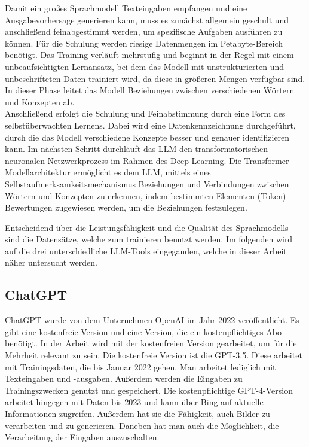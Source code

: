 Damit ein großes Sprachmodell Texteingaben empfangen und eine Ausgabevorhersage generieren kann, muss es zunächst 
allgemein geschult und anschließend feinabgestimmt werden, um spezifische Aufgaben ausführen zu können. Für die 
Schulung werden riesige Datenmengen im Petabyte-Bereich benötigt. Das Training verläuft mehrstufig und beginnt in 
der Regel mit einem unbeaufsichtigten Lernansatz, bei dem das Modell mit unstrukturierten und unbeschrifteten Daten 
trainiert wird, da diese in größeren Mengen verfügbar sind. In dieser Phase leitet das Modell Beziehungen zwischen 
verschiedenen Wörtern und Konzepten ab.\\
Anschließend erfolgt die Schulung und Feinabstimmung durch eine Form des selbstüberwachten Lernens. Dabei wird eine 
Datenkennzeichnung durchgeführt, durch die das Modell verschiedene Konzepte besser und genauer identifizieren kann. 
Im nächsten Schritt durchläuft das LLM den transformatorischen neuronalen Netzwerkprozess im Rahmen des Deep Learning. 
Die Transformer-Modellarchitektur ermöglicht es dem LLM, mittels eines Selbstaufmerksamkeitsmechanismus Beziehungen 
und Verbindungen zwischen Wörtern und Konzepten zu erkennen, indem bestimmten Elementen (Token) Bewertungen zugewiesen 
werden, um die Beziehungen festzulegen.

Entscheidend über die Leistungsfähigkeit und die Qualität des Sprachmodells sind die Datensätze, welche zum trainieren
benutzt werden. Im folgenden wird auf die drei unterschiedliche LLM-Tools eingeganden, welche in dieser Arbeit näher 
untersucht werden.

\subsection{ChatGPT}  \label{ChatGPT}

ChatGPT wurde von dem Unternehmen OpenAI im Jahr 2022 veröffentlicht. Es gibt eine kostenfreie Version und  
eine Version, die ein kostenpflichtiges Abo benötigt. In der Arbeit wird mit der kostenfreien Version gearbeitet,  
um für die Mehrheit relevant zu sein. Die kostenfreie Version ist die GPT-3.5. Diese arbeitet mit Trainingsdaten,  
die bis Januar 2022 gehen. Man arbeitet lediglich mit Texteingaben und -ausgaben. Außerdem werden die Eingaben  
zu Trainingszwecken genutzt und gespeichert. Die kostenpflichtige GPT-4-Version arbeitet hingegen mit Daten  
bis 2023 und kann über Bing auf aktuelle Informationen zugreifen. Außerdem hat sie die Fähigkeit, auch Bilder  
zu verarbeiten und zu generieren. Daneben hat man auch die Möglichkeit, die Verarbeitung der Eingaben auszuschalten. 

